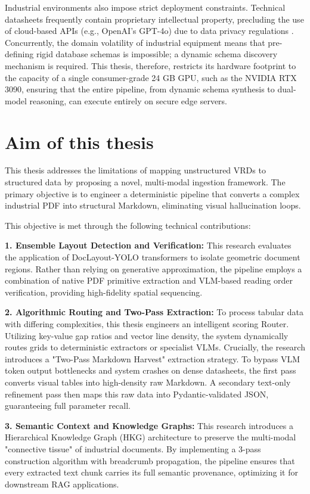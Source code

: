 Industrial environments also impose strict deployment constraints. Technical datasheets frequently contain proprietary intellectual property, precluding the use of cloud-based APIs (e.g., OpenAI's GPT-4o) due to data privacy regulations \citep{docling}. Concurrently, the domain volatility of industrial equipment means that pre-defining rigid database schemas is impossible; a dynamic schema discovery mechanism is required. This thesis, therefore, restricts its hardware footprint to the capacity of a single consumer-grade 24 GB GPU, such as the NVIDIA RTX 3090, ensuring that the entire pipeline, from dynamic schema synthesis to dual-model reasoning, can execute entirely on secure edge servers.

\section{Aim of this thesis}
\label{sec:aim}

This thesis addresses the limitations of mapping unstructured VRDs to structured data by proposing a novel, multi-modal ingestion framework. The primary objective is to engineer a deterministic pipeline that converts a complex industrial PDF into structural Markdown, eliminating visual hallucination loops.

This objective is met through the following technical contributions:

\textbf{1. Ensemble Layout Detection and Verification:}
This research evaluates the application of DocLayout-YOLO transformers \citep{doclayout_yolo} to isolate geometric document regions. Rather than relying on generative approximation, the pipeline employs a combination of native PDF primitive extraction and VLM-based reading order verification, providing high-fidelity spatial sequencing. 

\textbf{2. Algorithmic Routing and Two-Pass Extraction:}
To process tabular data with differing complexities, this thesis engineers an intelligent scoring Router. Utilizing key-value gap ratios and vector line density, the system dynamically routes grids to deterministic extractors or specialist VLMs. Crucially, the research introduces a "Two-Pass Markdown Harvest" extraction strategy. To bypass VLM token output bottlenecks and system crashes on dense datasheets, the first pass converts visual tables into high-density raw Markdown. A secondary text-only refinement pass then maps this raw data into Pydantic-validated JSON, guaranteeing full parameter recall.

\textbf{3. Semantic Context and Knowledge Graphs:}
This research introduces a Hierarchical Knowledge Graph (HKG) architecture to preserve the multi-modal "connective tissue" of industrial documents. By implementing a 3-pass construction algorithm with breadcrumb propagation, the pipeline ensures that every extracted text chunk carries its full semantic provenance, optimizing it for downstream RAG applications.

